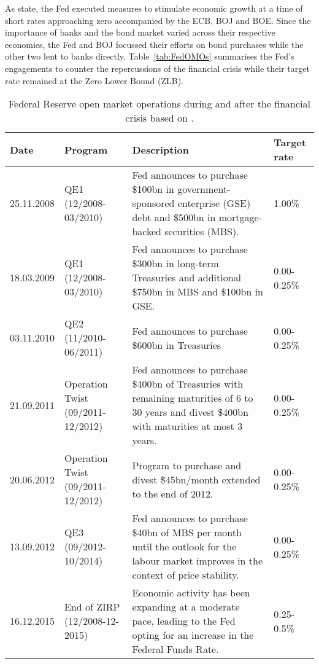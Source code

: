 As \textcite{Fawley.2013} state, the Fed executed measures to stimulate economic growth at a time of short rates approaching zero accompanied by the ECB, BOJ and BOE. Since the importance of banks and the bond market varied across their respective economies, the Fed and BOJ focussed their efforts on bond purchases while the other two lent to banks directly. Table~\vref{tab:FedOMOs} summarises the Fed's engagements to counter the repercussions of the financial crisis while their target rate remained at the Zero Lower Bound (ZLB). 
%
%
\begin{sidewaystable}[htbp]
	\small
	\caption[Important Announcements by the Federal Reserve]{Federal Reserve open market operations during and after the financial crisis based on \textcite[p.~61]{Fawley.2013}.}
	\label{tab:FedOMOs}
	\centering
	\begin{tabular}{ll p{8cm}l}
		\toprule
		Date & Program & Description & Target rate  \\
		\midrule
		25.11.2008 & QE1 (12/2008-03/2010) & Fed announces to purchase \$100bn in government-sponsored enterprise (GSE) debt and \$500bn
			in mortgage-backed securities (MBS). & 1.00\% \\
		18.03.2009 & QE1 (12/2008-03/2010) & Fed announces to purchase \$300bn in long-term Treasuries and additional \$750bn in MBS and \$100bn in GSE. & 0.00-0.25\% \\
		03.11.2010 & QE2 (11/2010-06/2011) & Fed announces to purchase \$600bn in Treasuries &  0.00-0.25\% \\
		21.09.2011 & Operation Twist (09/2011-12/2012) & Fed announces to purchase \$400bn of Treasuries with remaining maturities of 6 to 30 years and divest \$400bn with maturities at most 3 years. & 0.00-0.25\% \\
		20.06.2012 & Operation Twist (09/2011-12/2012) & Program to purchase and divest \~\$45bn/month extended to the end of 2012. & 0.00-0.25\% \\
 		13.09.2012 & QE3 (09/2012-10/2014)& Fed announces to purchase \$40bn of MBS per month until the outlook for the labour market improves in the context of price stability. & 0.00-0.25\% \\
 		16.12.2015 & End of ZIRP (12/2008-12-2015) & Economic activity has been expanding at a moderate pace, leading to the Fed opting for an increase in the Federal Funds Rate. & 0.25-0.5\% \\
		\bottomrule
	\end{tabular}
\end{sidewaystable}
%

